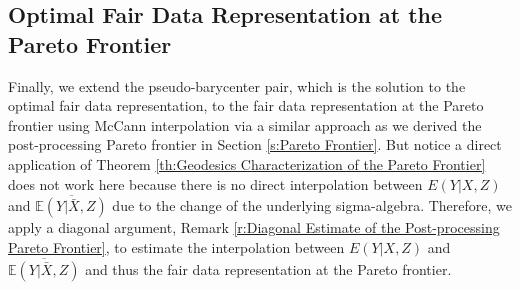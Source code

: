 \documentclass[twoside,11pt]{article}
\begin{document}
\subsection{Optimal Fair Data Representation at the Pareto Frontier} \label{s:Optimal Fair Data Representation at the Pareto Frontier}

Finally, we extend the pseudo-barycenter pair, which is the solution to the optimal fair data representation, to the fair data representation at the Pareto frontier using McCann interpolation via a similar approach as we derived the post-processing Pareto frontier in Section \ref{s:Pareto Frontier}. But notice a direct application of Theorem \ref{th:Geodesics Characterization of the Pareto Frontier} does not work here because there is no direct interpolation between $E(Y|X,Z)$ and $\overline{\mathbb{E}(Y|\bar{X},Z)}$ due to the change of the underlying sigma-algebra. Therefore, we apply a diagonal argument, Remark \ref{r:Diagonal Estimate of the Post-processing Pareto Frontier}, to estimate the interpolation between $E(Y|X,Z)$ and $\overline{\mathbb{E}(Y|\bar{X},Z)}$ and thus the fair data representation at the Pareto frontier.
\end{document}
